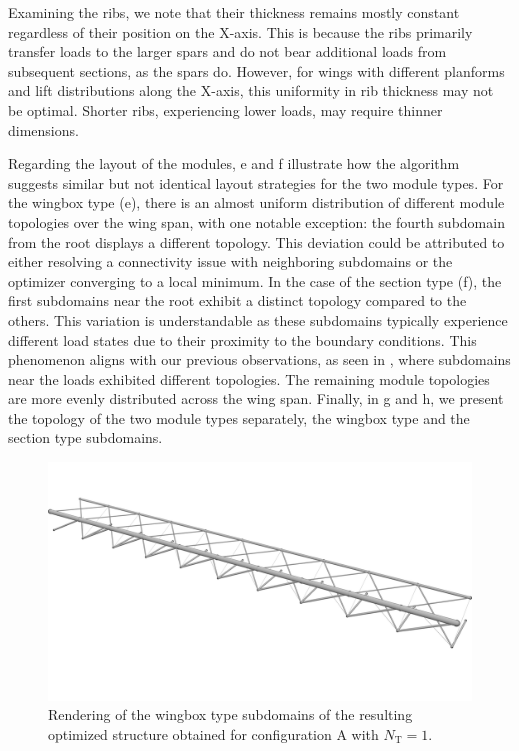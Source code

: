 Examining the ribs, we note that their thickness remains mostly constant regardless of their position on the X-axis. This is because the ribs primarily transfer loads to the larger spars and do not bear additional loads from subsequent sections, as the spars do. However, for wings with different planforms and lift distributions along the X-axis, this uniformity in rib thickness may not be optimal. Shorter ribs, experiencing lower loads, may require thinner dimensions. 

Regarding the layout of the modules, e and f illustrate how the algorithm suggests similar but not identical layout strategies for the two module types. For the wingbox type (e), there is an almost uniform distribution of different module topologies over the wing span, with one notable exception: the fourth subdomain from the root displays a different topology. This deviation could be attributed to either resolving a connectivity issue with neighboring subdomains or the optimizer converging to a local minimum. In the case of the section type (f), the first subdomains near the root exhibit a distinct topology compared to the others. This variation is understandable as these subdomains typically experience different load states due to their proximity to the boundary conditions. This phenomenon aligns with our previous observations, as seen in , where subdomains near the loads exhibited different topologies. The remaining module topologies are more evenly distributed across the wing span. Finally, in g and h, we present the topology of the two module types separately, the wingbox type and the section type subdomains.

\begin{figure}
    \centering
    \includegraphics[width=0.8\linewidth]{figures/07_aeronautic/00_NACA_c_1/04_Topology_cell_iso.png}
        \caption{Rendering of the wingbox type subdomains of the resulting optimized structure obtained for configuration A with $N_\text{T}=1$.}
    \label{fig:07_wingbox_a_nt1}
\end{figure}


